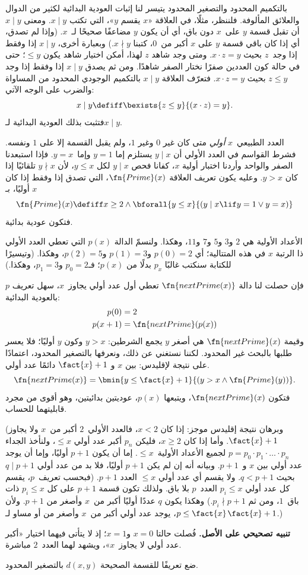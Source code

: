 \documentclass[../../../include/open-logic-section]{subfiles}
\begin{document}

بالتكميم المحدود والتصغير المحدود يتيسر لنا إثبات العودية البدائية لكثير من الدوال
والعلائق المألوفة. فلننظر، مثلًا، في العلاقة «$x$ يقسم
$y$»، التي تكتب $x\mid y$. ومعنى $x\mid y$ أن تقبل قسمة
$y$ على~$x$ دون باق، أي أن يكون $y$ مضاعفًا صحيحًا لـ~$x$. (وإذا لم
تصدق، أي إذا كان باقي قسمة $y$ على $x$ أكبر من~$0$، كتبنا
$x\nmid y$.) وبعبارة أخرى، $x\mid y$ إذا وفقط إذا وجد~$z$ بحيث
$x\cdot z=y$. ومتى وجد شاهد $z$ لهذا، أمكن اختيار شاهد يكون
$\leq y$؛ حتى في حالة كون العددين صفرًا نختار الصفر شاهدًا. ومن ثم يصدق $x\mid y$ إذا وفقط إذا وجد $z\le y$ بحيث
$x\cdot z=y$. فتعرّف العلاقة $x\mid y$ بالتكميم الوجودي
المحدود من المساواة والضرب على الوجه الآتي:
\[
x \mid y \defiff \bexists{z \leq y}{(x \cdot z) = y}.
\]
فتثبت بذلك العودية البدائية لـ$x\mid y$.

العدد الطبيعي~$x$ \emph{أولي} متى كان غير $0$ وغير $1$، ولم
يقبل القسمة إلا على $1$ ونفسه. فشرط القواسم في العدد
الأولي أن $y\mid x$ يستلزم إما $y=1$ وإما~$y=x$. فإذا استبعدنا الصفر والواحد وأردنا
اختبار أولية $x$، كفانا فحص $y\mid x$ لكل $y\le x$، لأن
$y\nmid x$ تلقائيًا إذا كان $y>x$. وعليه يكون تعريف العلاقة
$\fn{Prime}(x)$، التي تصدق إذا وفقط إذا كان $x$ أوليًا، بـ
\[
\fn{Prime}(x) \defiff x \geq 2 \land \bforall{y \leq x}{(y \mid x \lif y
  = 1 \lor y = x)}
\]
فتكون عودية بدائية.

الأعداد الأولية هي $2$ و$3$ و$5$ و$7$ و$11$، وهكذا. ولنسمّ الدالة
$p(x)$ التي تعطي العدد الأولي ذا الرتبة $x$ في هذه المتتالية؛ أي
$p(0)=2$ و$p(1)=3$ و$p(2)=5$، وهكذا. (وتيسيرًا للكتابة سنكتب غالبًا
$p_x$ بدلًا من $p(x)$؛ فـ$p_0=2$ و$p_1=3$، وهكذا.)

فإن حصلت لنا دالة $\fn{nextPrime(x)}$ تعطي أول عدد أولي يجاوز~$x$،
سهل تعريف $p$ بالعودية البدائية:
\begin{align*}
  p(0) & = 2\\
  p(x+1) & = \fn{nextPrime}(p(x))
\end{align*}
وقيمة $\fn{nextPrime}(x)$ هي أصغر $y$ يجمع الشرطين: $y>x$ وكون $y$ أوليًا؛ فلا يعسر
طلبها بالبحث غير المحدود. لكننا نستغني عن ذلك، ونعرفها بالتصغير
المحدود، اعتمادًا على نتيجة لإقليدس: بين $x$ و
$\fact{x}+1$ دائمًا عدد أولي.
\[
  \fn{nextPrime(x)} =
  \bmin{y \leq \fact{x}+1}{(y > x \land \fn{Prime}(y))}.
\]
فتكون $\fn{nextPrime}(x)$، ويتبعها $p(x)$، عوديتين بدائيتين،
وهو أقوى من مجرد قابليتهما للحساب.

(وبرهان نتيجة إقليدس موجز: إذا كان $x<2$، فالعدد الأولي~$2$ أكبر
من~$x$ ولا يجاوز $\fact{x}+1$. وأما إذا كان $x\geq2$، فليكن $p_n$
أكبر عدد أولي $\le x$، ولنأخذ الجداء
$p=p_0\cdot p_1\cdot\dots\cdot p_n$ لجميع الأعداد الأولية~$\le x$.
إما أن يكون $p+1$ أوليًا، وإما أن يوجد عدد أولي بين $x$ و~$p+1$.
وبيانه أنه إن لم يكن $p+1$ أوليًا، فلا بد من عدد أولي $q\mid p+1$
بحيث $q<p+1$. ولا يقسم أي عدد أولي $\le x$ العدد $p+1$. (فبحسب
تعريف~$p$، يقسم كل عدد أولي $p_i\le x$ العدد~$p$ بلا باق. ولذلك تكون
قسمة $p+1$ على كل $p_i\le x$ ذات باق~$1$، ومن ثم
$p_i\nmid p+1$.) وهكذا يكون $q$ عددًا أوليًا أكبر من~$x$ وأصغر من
$p+1$. ولأن $p\le\fact{x}$، يوجد عدد أولي أكبر من~$x$ وأصغر من أو
مساو لـ$\fact{x}+1$.)

\textbf{تنبيه تصحيحي على الأصل.} فُصلت حالتا $x=0$ و$x=1$؛ إذ لا
يتأتى فيهما اختيار «أكبر عدد أولي لا يجاوز~$x$»، ويشهد لهما العدد~$2$
مباشرة.

\begin{prob}
ضع تعريفًا للقسمة الصحيحة $d(x,y)$ بالتصغير المحدود.
\end{prob}
\end{document}

